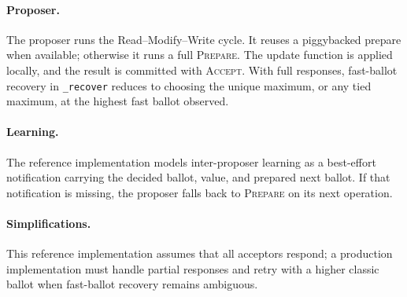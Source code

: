 \paragraph{Proposer.}
The proposer runs the Read--Modify--Write cycle.
It reuses a piggybacked prepare when available; otherwise it runs a full \textsc{Prepare}.
The update function is applied locally, and the result is committed with \textsc{Accept}.
With full responses, fast-ballot recovery in \texttt{\_recover} reduces to choosing the unique maximum, or any tied maximum, at the highest fast ballot observed.

\paragraph{Learning.}
The reference implementation models inter-proposer learning as a best-effort notification carrying the decided ballot, value, and prepared next ballot.
If that notification is missing, the proposer falls back to \textsc{Prepare} on its next operation.

\paragraph{Simplifications.}
This reference implementation assumes that all acceptors respond; a production implementation must handle partial responses and retry with a higher classic ballot when fast-ballot recovery remains ambiguous.

